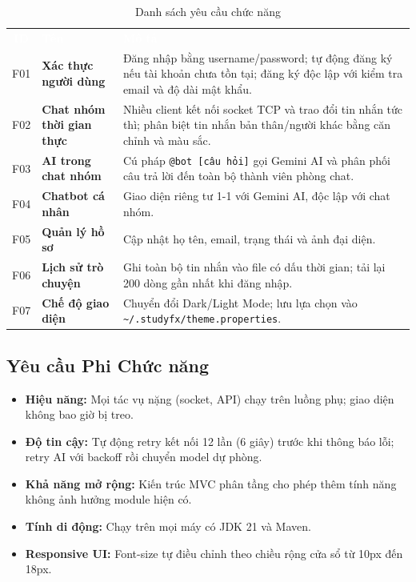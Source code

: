 \documentclass[12pt, a4paper, oneside]{report}
\newcommand{\code}[1]{\texttt{\color{hustblue!80!black}#1}}
\newcommand{\rA}{\rowcolor{rowA}}
\newcommand{\rB}{\rowcolor{rowB}}
\begin{document}
\begin{table}[H]
  \centering
  \caption{Danh sách yêu cầu chức năng}
  \label{tab:func}
  \begin{tabularx}{\linewidth}{c >{\bfseries\color{hustblue}}l X}
    \rowcolor{headerrow}
    \textcolor{white}{\textbf{ID}} &
    \textcolor{white}{\textbf{Tên}} &
    \textcolor{white}{\textbf{Mô tả}} \\
    \rA F01 & Xác thực người dùng &
      Đăng nhập bằng username/password; tự động đăng ký nếu tài khoản
      chưa tồn tại; đăng ký độc lập với kiểm tra email và độ dài mật khẩu. \\
    \rB F02 & Chat nhóm thời gian thực &
      Nhiều client kết nối socket TCP và trao đổi tin nhắn tức thì;
      phân biệt tin nhắn bản thân/người khác bằng căn chỉnh và màu sắc. \\
    \rA F03 & AI trong chat nhóm &
      Cú pháp \code{@bot [câu hỏi]} gọi Gemini AI và phân phối câu
      trả lời đến toàn bộ thành viên phòng chat. \\
    \rB F04 & Chatbot cá nhân &
      Giao diện riêng tư 1-1 với Gemini AI, độc lập với chat nhóm. \\
    \rA F05 & Quản lý hồ sơ &
      Cập nhật họ tên, email, trạng thái và ảnh đại diện. \\
    \rB F06 & Lịch sử trò chuyện &
      Ghi toàn bộ tin nhắn vào file có dấu thời gian; tải lại 200 dòng
      gần nhất khi đăng nhập. \\
    \rA F07 & Chế độ giao diện &
      Chuyển đổi Dark/Light Mode; lưu lựa chọn vào
      \code{\textasciitilde/.studyfx/theme.properties}. \\
  \end{tabularx}
\end{table}

\subsection{Yêu cầu Phi Chức năng}

\begin{itemize}[leftmargin=2em, itemsep=4pt]
  \item \textbf{Hiệu năng:} Mọi tác vụ nặng (socket, API) chạy trên luồng
    phụ; giao diện không bao giờ bị treo.
  \item \textbf{Độ tin cậy:} Tự động retry kết nối 12 lần (6 giây) trước
    khi thông báo lỗi; retry AI với backoff rồi chuyển model dự phòng.
  \item \textbf{Khả năng mở rộng:} Kiến trúc MVC phân tầng cho phép thêm
    tính năng không ảnh hưởng module hiện có.
  \item \textbf{Tính di động:} Chạy trên mọi máy có JDK 21 và Maven.
  \item \textbf{Responsive UI:} Font-size tự điều chỉnh theo chiều rộng
    cửa sổ từ 10px đến 18px.
\end{itemize}
\end{document}
